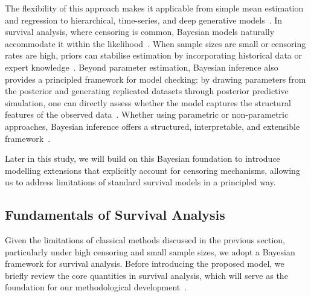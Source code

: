 The flexibility of this approach makes it applicable from simple mean estimation and regression to hierarchical, time-series, and deep generative models~\cite{carlin1997bayes}. In survival analysis, where censoring is common, Bayesian models naturally accommodate it within the likelihood~\cite{bartovs2022informed}. When sample sizes are small or censoring rates are high, priors can stabilise estimation by incorporating historical data or expert knowledge~\cite{gelman1995bayesian}. Beyond parameter estimation, Bayesian inference also provides a principled framework for model checking: by drawing parameters from the posterior and generating replicated datasets through posterior predictive simulation, one can directly assess whether the model captures the structural features of the observed data~\cite{https://doi.org/10.1002/ecm.1314, cho2025nonlinear}. Whether using parametric or non-parametric approaches, Bayesian inference offers a structured, interpretable, and extensible framework~\cite{van2021bayesian}. 

Later in this study, we will build on this Bayesian foundation to introduce modelling extensions that explicitly account for censoring mechanisms, allowing us to address limitations of standard survival models in a principled way.



\subsection{Fundamentals of Survival Analysis} \label{Fundamentals of Survival Analysis}
Given the limitations of classical methods discussed in the previous section, particularly under high censoring and small sample sizes, we adopt a Bayesian framework for survival analysis. Before introducing the proposed model, we briefly review the core quantities in survival analysis, which will serve as the foundation for our methodological development~\cite{kleinbaum1996survival}.

